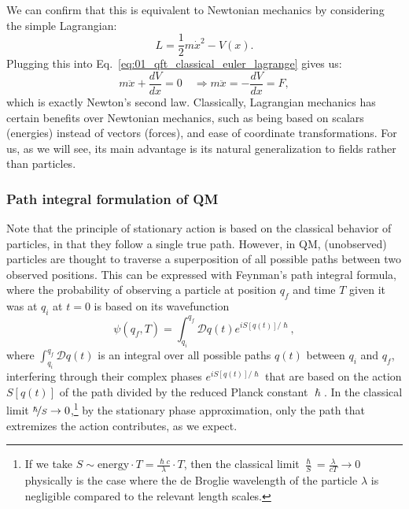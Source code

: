 \begin{example}
\label{ex:01_qft_lagrangian_classical_newton}
We can confirm that this is equivalent to Newtonian mechanics by considering the simple Lagrangian:
\begin{equation}
\label{eq:01_qft_classical_lagrangian_newton}
L = \frac{1}{2}m\dot x^2 - V(x).
\end{equation}
Plugging this into Eq.~\ref{eq:01_qft_classical_euler_lagrange} gives us:
\begin{equation}
	\label{eq:01_qft_classical_euler_lagrange_newton}
	m\ddot x + \frac{d V}{d x} = 0 \quad\Rightarrow m\ddot x = -\frac{d V}{d x} = F,
\end{equation}
which is exactly Newton's second law.
Classically, Lagrangian mechanics has certain benefits over Newtonian mechanics, such as being based on scalars (energies) instead of vectors (forces), and ease of coordinate transformations.
For us, as we will see, its main advantage is its natural generalization to fields rather than particles.
\end{example}

\subsubsection{Path integral formulation of QM}
\label{sec:01_qft_classical_path_integral}

Note that the principle of stationary action is based on the classical behavior of particles, in that they follow a single true path.
However, in QM, (unobserved) particles are thought to traverse a superposition of all possible paths between two observed positions.
This can be expressed with Feynman's path integral formula, where the probability of observing a particle at position $q_f$ and time $T$ given it was at $q_i$ at $t = 0$ is based on its wavefunction
\begin{equation}
	\label{eq:01_qft_lagrangian_path_integral}
	\psi(q_f, T) = \int_{q_i}^{q_f} \mathcal{D}q(t) e^{iS[q(t)]/\hslash},
\end{equation}
where $\int_{q_i}^{q_f}\mathcal{D}q(t)$ is an integral over all possible paths $q(t)$ between $q_i$ and $q_f$, interfering through their complex phases $e^{iS[q(t)]/\hslash}$ that are based on the action $S[q(t)]$ of the path divided by the reduced Planck constant $\hslash$.
In the classical limit $\cnicefrac{\hslash}{S} \rightarrow 0$,\footnote{If we take $S \sim \mathrm{energy} \cdot T = \frac{\hslash c}{\lambda}\cdot T$, then the classical limit $\frac{\hslash}{S} = \frac{\lambda}{cT} \rightarrow 0$ physically is the case where the de Broglie wavelength of the particle $\lambda$ is negligible compared to the relevant length scales.} by the stationary phase approximation, only the path that extremizes the action contributes, as we expect.

